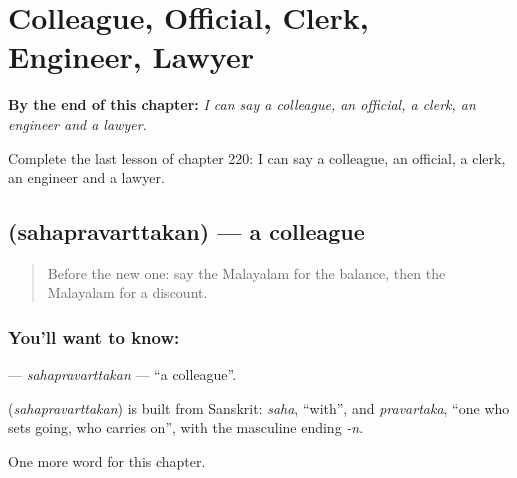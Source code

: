 
\chapter{Colleague, Official, Clerk, Engineer, Lawyer}
\label{ch:ml-colleague-official-clerk-engineer-lawyer}

\begin{chapteropening}
\textbf{By the end of this chapter:} \emph{I can say a colleague, an official, a clerk, an engineer and a lawyer.}

Complete the last lesson of chapter 220: I can say a colleague, an official, a clerk, an engineer and a lawyer.
\end{chapteropening}

\section[\texorpdfstring{\ml{സഹപ്രവർത്തകൻ} (sahapravarttakan)}{സഹപ്രവർത്തകൻ (sahapravarttakan)}]{ (sahapravarttakan) — a colleague}

\label{lesson:ML-C220-sahapravarttakan}



\begin{quote}
Before the new one: say the Malayalam for the balance, then the Malayalam for a discount.
\end{quote}

\subsection*{You'll want to know: }
\textbf{} — \emph{sahapravarttakan} — \textquotedblleft{}a colleague\textquotedblright{}.

\begin{cousinweb}
\textbf{} (\emph{sahapravarttakan}) is built from Sanskrit: \emph{saha}, \textquotedblleft{}with\textquotedblright{}, and \emph{pravartaka}, \textquotedblleft{}one who sets going, who carries on\textquotedblright{}, with the masculine ending \emph{-n}.
\end{cousinweb}

\begin{grammarlens}[title={What you've built}]
One more word for this chapter.
\end{grammarlens}

